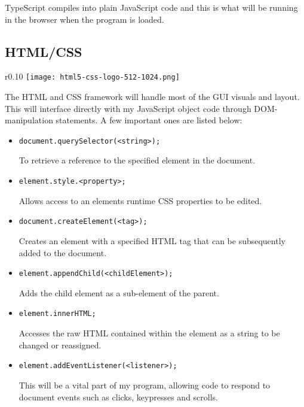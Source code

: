         TypeScript compiles into plain JavaScript code and this is what will be running in the browser when the program is loaded.

    \subsection{HTML/CSS}
    \label{html/css}

        \begin{wrapfigure}{r}{0.10\textwidth}
            \centering
            \texttt{[image: html5-css-logo-512-1024.png]}
        \end{wrapfigure}

        The HTML and CSS framework will handle most of the GUI visuals and layout. This will interface directly with my JavaScript object code through DOM-manipulation statements. A few important ones are listed below:

        \begin{itemize}
            \item \begin{lstlisting}
document.querySelector(<string>);\end{lstlisting}
To retrieve a reference to the specified element in the document.
            \item \begin{lstlisting}
element.style.<property>;\end{lstlisting}
Allows access to an elements runtime CSS properties to be edited.
            \item \begin{lstlisting}
document.createElement(<tag>);\end{lstlisting}
Creates an element with a specified HTML tag that can be subsequently added to the document.
            \item \begin{lstlisting}
element.appendChild(<childElement>);\end{lstlisting}
Adds the child element as a sub-element of the parent.
            \item \begin{lstlisting}
element.innerHTML;\end{lstlisting}
Accesses the raw HTML contained within the element as a string to be changed or reassigned.
            \item \begin{lstlisting}
element.addEventListener(<listener>);\end{lstlisting}
This will be a vital part of my program, allowing code to respond to document events such as clicks, keypresses and scrolls.
        \end{itemize}

